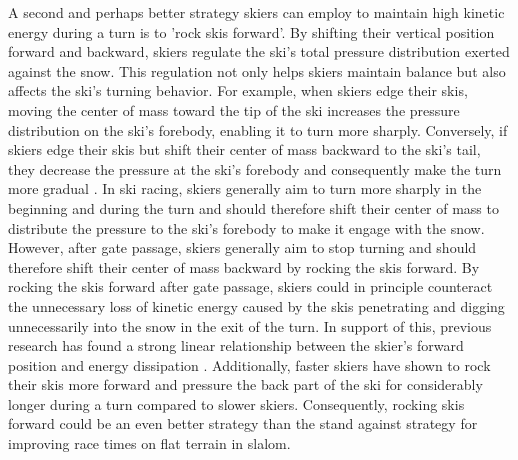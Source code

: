A second and perhaps better strategy skiers can employ to maintain high kinetic energy during a turn is to 'rock skis forward'. By shifting their vertical position forward and backward, skiers regulate the ski’s total pressure distribution exerted against the snow\cite{lemaster_skiers_1999, lemaster_ultimate_2010, howe_new_2001}. This regulation not only helps skiers maintain balance but also affects the ski's turning behavior. For example, when skiers edge their skis, moving the center of mass toward the tip of the ski increases the pressure distribution on the ski's forebody, enabling it to turn more sharply. Conversely, if skiers edge their skis but shift their center of mass backward to the ski's tail, they decrease the pressure at the ski's forebody and consequently make the turn more gradual \cite{lemaster_skiers_1999, lemaster_ultimate_2010}. In ski racing, skiers generally aim to turn more sharply in the beginning and during the turn and should therefore shift their center of mass to distribute the pressure to the ski's forebody to make it engage with the snow. However, after gate passage, skiers generally aim to stop turning and should therefore shift their center of mass backward by rocking the skis forward. By rocking the skis forward after gate passage, skiers could in principle counteract the unnecessary loss of kinetic energy caused by the skis penetrating and digging unnecessarily into the snow in the exit of the turn. In support of this, previous research has found a strong linear relationship between the skier's forward position and energy dissipation \cite{reid_turn_2009, reid_kinematic_2010}. Additionally, faster skiers have shown to rock their skis more forward and pressure the back part of the ski for considerably longer during a turn compared to slower skiers\cite{reid_kinematic_2010, tjorhom_beskrivelse_2007}. Consequently, rocking skis forward could be an even better strategy than the stand against strategy for improving race times on flat terrain in slalom. 

